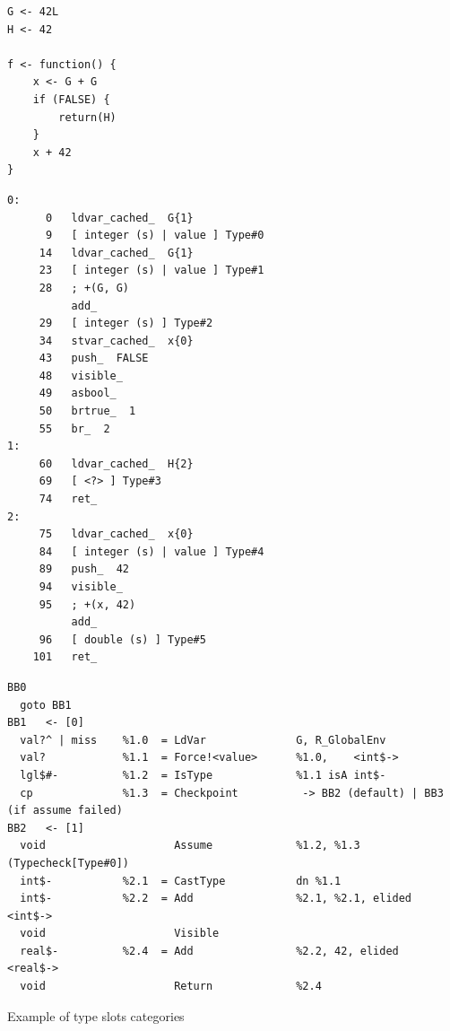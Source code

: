 \begin{listing}[p]
	\begin{minipage}{0.47\textwidth}
		\begin{verbatim}
G <- 42L
H <- 42

f <- function() {
    x <- G + G
    if (FALSE) {
        return(H)
    }
    x + 42
}
    \end{verbatim}
	\end{minipage}
	\hfill
	\begin{minipage}{0.47\textwidth}
		\begin{verbatim}
0:
      0   ldvar_cached_  G{1}
      9   [ integer (s) | value ] Type#0
     14   ldvar_cached_  G{1}
     23   [ integer (s) | value ] Type#1
     28   ; +(G, G)
          add_
     29   [ integer (s) ] Type#2
     34   stvar_cached_  x{0}
     43   push_  FALSE
     48   visible_
     49   asbool_
     50   brtrue_  1
     55   br_  2
1:
     60   ldvar_cached_  H{2}
     69   [ <?> ] Type#3
     74   ret_
2:
     75   ldvar_cached_  x{0}
     84   [ integer (s) | value ] Type#4
     89   push_  42
     94   visible_
     95   ; +(x, 42)
          add_
     96   [ double (s) ] Type#5
    101   ret_
    \end{verbatim}
	\end{minipage}
	\vfill
	\begin{adjustwidth}{-1cm}{-1cm}
		\begin{minipage}{\textwidth}
			\begin{verbatim}
BB0
  goto BB1
BB1   <- [0]
  val?^ | miss    %1.0  = LdVar              G, R_GlobalEnv
  val?            %1.1  = Force!<value>      %1.0,    <int$->
  lgl$#-          %1.2  = IsType             %1.1 isA int$-
  cp              %1.3  = Checkpoint          -> BB2 (default) | BB3 (if assume failed)
BB2   <- [1]
  void                    Assume             %1.2, %1.3 (Typecheck[Type#0])
  int$-           %2.1  = CastType           dn %1.1
  int$-           %2.2  = Add                %2.1, %2.1, elided   <int$->
  void                    Visible
  real$-          %2.4  = Add                %2.2, 42, elided   <real$->
  void                    Return             %2.4
      \end{verbatim}
			\label{lst:unused-example-pir}
		\end{minipage}
		\caption{Example of type slots categories}\label{lst:unused-example}
	\end{adjustwidth}
\end{listing}


